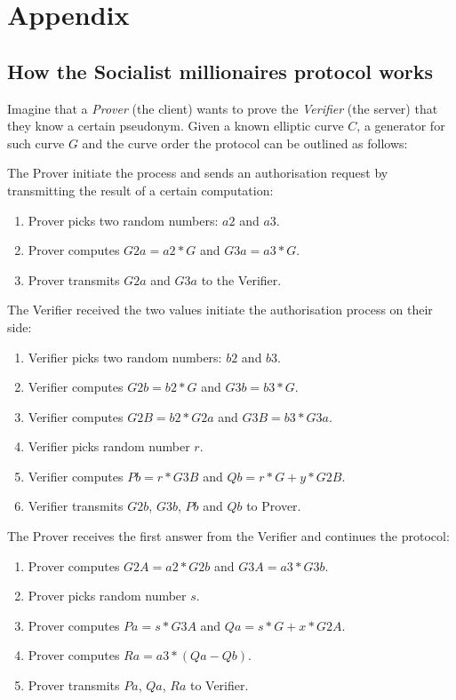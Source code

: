 \chapter*{Appendix}

\section{How the Socialist millionaires protocol works}

Imagine that a \emph{Prover} (the client) wants to prove the \emph{Verifier} (the server) that they know a certain pseudonym. Given a known elliptic curve $C$, a generator for such curve $G$ and the curve order the protocol can be outlined as follows:

The Prover initiate the process and sends an authorisation request by transmitting the result of a certain computation:
\begin{enumerate}
    \item Prover picks two random numbers: $a2$ and $a3$.
    \item Prover computes $G2a = a2 * G$ and $G3a = a3 * G$.
    \item Prover transmits $G2a$ and $G3a$ to the Verifier.
\end{enumerate}

The Verifier received the two values initiate the authorisation process on their side:
\begin{enumerate}
    \item Verifier picks two random numbers: $b2$ and $b3$. 
    \item Verifier computes $G2b = b2 * G$ and $G3b = b3 * G$.
    \item Verifier computes $G2B = b2 * G2a$ and $G3B = b3 * G3a$.
    \item Verifier picks random number $r$.
    \item Verifier computes $Pb = r * G3B$ and $Qb = r * G + y * G2B$.
    \item Verifier transmits $G2b$, $G3b$, $Pb$ and $Qb$ to Prover.
\end{enumerate}

The Prover receives the first answer from the Verifier and continues the protocol:
\begin{enumerate}
    \item Prover computes $G2A = a2 * G2b$ and $G3A = a3 * G3b$.
    \item Prover picks random number $s$.
    \item Prover computes $Pa = s * G3A$ and $Qa = s * G + x * G2A$.
    \item Prover computes $Ra = a3 * (Qa - Qb)$.
    \item Prover transmits $Pa$, $Qa$, $Ra$ to Verifier.
\end{enumerate}

